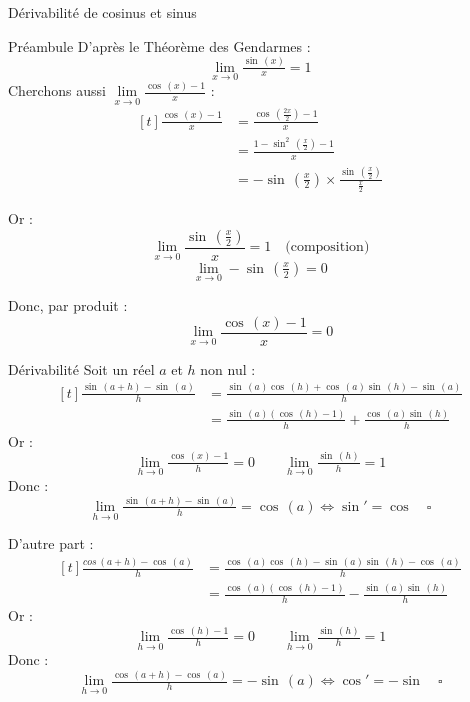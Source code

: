 \documentclass{cours}
\let\frac\tfrac %
\begin{document}
\begin{Gpartie}{Dérivabilité de cosinus et sinus}
\begin{Spartie}{Préambule}
            D'après le Théorème des Gendarmes : \[\lim\limits_{x\to0}\frac{\sin\,(x)}{x}=1\]
            \vspace{2ex}
            Cherchons aussi \quad $\lim\limits_{x\to0}\frac{\cos\,(x)-1}{x}$ : 
            \[\begin{aligned}[t]
                \frac{\cos\,(x)-1}{x} &= \frac{\cos\,\left(\frac{2x}{2}\right)-1}{x} \\
                &= \frac{1-\sin^2\,\left(\frac{x}{2}\right)-1}{x} \\
                &= -\sin\,\left(\frac{x}{2}\right)\times\frac{\sin\,\left(\frac{x}{2}\right)}{\frac{x}{2}}
            \end{aligned}\]
            
            Or :  \[\lim\limits_{x\to0}\dfrac{\sin\,\left(\frac{x}{2}\right)}{x}=1\quad\text{(composition)}\] \[\lim\limits_{x\to0}-\sin\,\left(\frac{x}{2}\right)=0\]

            Donc, par produit : \[\lim\limits_{x\to0}\dfrac{\cos\,(x)-1}{x}=0\]
        \end{Spartie}
        \pagebreak
        \begin{Spartie}{Dérivabilité} 
            Soit un réel $a$ et $h$ non nul : 
            \[\begin{aligned}[t]
                \frac{\sin\,(a+h)-\sin\,(a)}{h} &= \frac{\sin\,(a)\cos\,(h)+\cos\,(a)\sin\,(h)-\sin\,(a)}{h} \\
                &= \frac{\sin\,(a)\left(\cos\,(h)-1\right)}{h}+\frac{\cos\,(a)\sin\,(h)}{h}
            \end{aligned}\]
            Or : \[\lim\limits_{h\to0}\frac{\cos\,(x)-1}{h}=0\qquad\lim\limits_{h\to0}\frac{\sin\,(h)}{h}=1\]
            Donc : \[\lim\limits_{h\to0}\frac{\sin\,(a+h)-\sin\,(a)}{h}=\cos\,(a)\iff\sin'=\cos\quad\square\]

            D'autre part : 
            \[\begin{aligned}[t]
                \frac{cos\,(a+h)-\cos\,(a)}{h} &= \frac{\cos\,(a)\cos\,(h)-\sin\,(a)\sin\,(h)-\cos\,(a)}{h} \\
                &= \frac{\cos\,(a)(\cos\,(h)-1)}{h}-\frac{\sin\,(a)\sin\,(h)}{h}
            \end{aligned}\]
            Or : \[\lim\limits_{h\to0}\frac{\cos\,(h)-1}{h}=0\qquad\lim\limits_{h\to0}\frac{\sin\,(h)}{h}=1\]
            Donc : \[\lim\limits_{h\to0}\frac{\cos\,(a+h)-\cos\,(a)}{h}=-\sin\,(a)\iff\cos'=-\sin\quad\square\]

        \end{Spartie}
    \end{Gpartie}
\end{document}
